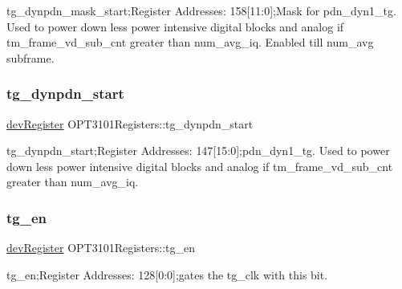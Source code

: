 tg\+\_\+dynpdn\+\_\+mask\+\_\+start;Register Addresses\+: 158\mbox{[}11\+:0\mbox{]};Mask for pdn\+\_\+dyn1\+\_\+tg. Used to power down less power intensive digital blocks and analog if tm\+\_\+frame\+\_\+vd\+\_\+sub\+\_\+cnt greater than num\+\_\+avg\+\_\+iq. Enabled till num\+\_\+avg subframe. 

\mbox{\label{class_o_p_t3101_registers_acc476f02740652cbbb2879dc7fc372b4}} 
\subsubsection{\texorpdfstring{tg\+\_\+dynpdn\+\_\+start}{tg\_dynpdn\_start}}
{\footnotesize\ttfamily \mbox{\hyperlink{classdev_register}{dev\+Register}} O\+P\+T3101\+Registers\+::tg\+\_\+dynpdn\+\_\+start}



tg\+\_\+dynpdn\+\_\+start;Register Addresses\+: 147\mbox{[}15\+:0\mbox{]};pdn\+\_\+dyn1\+\_\+tg. Used to power down less power intensive digital blocks and analog if tm\+\_\+frame\+\_\+vd\+\_\+sub\+\_\+cnt greater than num\+\_\+avg\+\_\+iq. 

\mbox{\label{class_o_p_t3101_registers_a5cb9d7749b80772a5c786912eaf1db91}} 
\subsubsection{\texorpdfstring{tg\+\_\+en}{tg\_en}}
{\footnotesize\ttfamily \mbox{\hyperlink{classdev_register}{dev\+Register}} O\+P\+T3101\+Registers\+::tg\+\_\+en}



tg\+\_\+en;Register Addresses\+: 128\mbox{[}0\+:0\mbox{]};gates the tg\+\_\+clk with this bit. 

\mbox{\label{class_o_p_t3101_registers_a46954b0719efcf8149baf13d4b34d40c}} 
